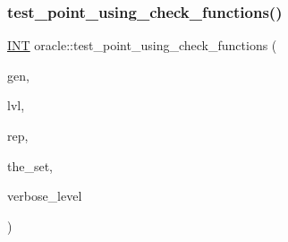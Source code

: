\mbox{\label{classoracle_aea2e35ca2b51a9251711735f6080217f}} 
\subsubsection{\texorpdfstring{test\+\_\+point\+\_\+using\+\_\+check\+\_\+functions()}{test\_point\_using\_check\_functions()}}
{\footnotesize\ttfamily \mbox{\hyperlink{galois_8h_a09fddde158a3a20bd2dcadb609de11dc}{I\+NT}} oracle\+::test\+\_\+point\+\_\+using\+\_\+check\+\_\+functions (\begin{DoxyParamCaption}\item[{\mbox{\hyperlink{classgenerator}{generator}} $\ast$}]{gen,  }\item[{\mbox{\hyperlink{galois_8h_a09fddde158a3a20bd2dcadb609de11dc}{I\+NT}}}]{lvl,  }\item[{\mbox{\hyperlink{galois_8h_a09fddde158a3a20bd2dcadb609de11dc}{I\+NT}}}]{rep,  }\item[{\mbox{\hyperlink{galois_8h_a09fddde158a3a20bd2dcadb609de11dc}{I\+NT}} $\ast$}]{the\+\_\+set,  }\item[{\mbox{\hyperlink{galois_8h_a09fddde158a3a20bd2dcadb609de11dc}{I\+NT}}}]{verbose\+\_\+level }\end{DoxyParamCaption})}

\mbox{\label{classoracle_ae86c3f9d4b95b5a6e88ee0959942ecde}} 
